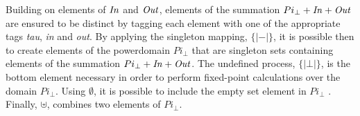 \documentclass[10pt,a4paper,final,oneside,fleqn]{book}
\begin{document}
Building on elements of $\mbox{{\itshape In\/}}$ and $\mbox{{\itshape Out\/}}$, elements of the summation $Pi_\bot+\mbox{{\itshape In\/}}+\mbox{{\itshape Out\/}}$ are ensured to be distinct by tagging each element with one of the appropriate tags {\itshape tau\/}, {\itshape in\/} and {\itshape out\/}. By applying the singleton mapping, $\{\!|-|\!\}$, it is possible then to create elements of the powerdomain $Pi_\bot$ that are singleton sets containing elements of the summation $Pi_\bot+\mbox{{\itshape In\/}}+\mbox{{\itshape Out\/}}$. The undefined process, $\{\!|\bot|\!\}$, is the bottom element necessary in order to perform fixed-point calculations over the domain $Pi_\bot$. Using $\emptyset$, it is possible to include the empty set element in $Pi_\bot$ \cite[Def. 3.4]{abramsky1}. Finally, $\uplus$, combines two elements of $Pi_\bot$.
\end{document}
